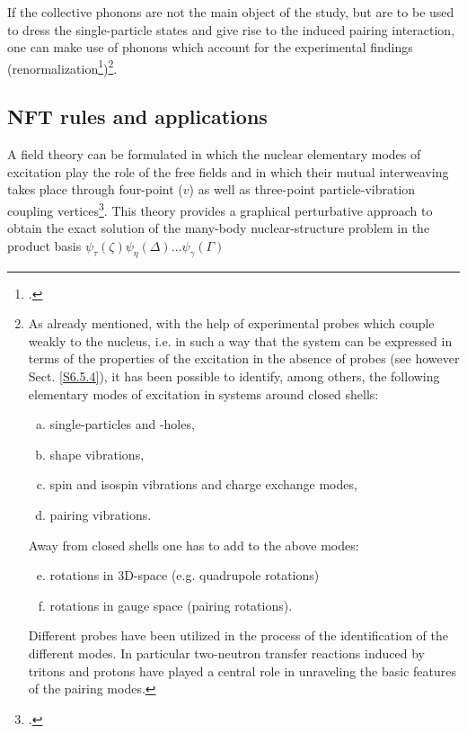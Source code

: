 If the collective phonons are not the main object  of the study, but are to be used to dress the single-particle states and give rise to the induced pairing interaction, one can make use of phonons which account for the experimental findings (renormalization\footnote{\cite{Idini:15,Broglia:16,Barranco:17}.})\footnote{As already mentioned, with the help of experimental probes which couple weakly to the nucleus,
i.e. in such a way that the system can be expressed in terms of the properties
of the excitation in the absence of probes (see however Sect. \ref{S6.5.4}), it has been possible to identify, among others, the
following elementary modes of excitation in systems around closed shells:
\begin{enumerate}[a)]
\item single-particles and -holes,
\item shape vibrations,
\item spin and isospin vibrations and charge exchange modes,
\item pairing vibrations.
\end{enumerate}
Away from closed shells one has to add to the above modes:
\begin{enumerate}[a)]
\setcounter{enumi}{4}
\item rotations in 3D-space (e.g. quadrupole rotations)
\item rotations in gauge space (pairing rotations).
\end{enumerate}
Different probes have been utilized in the process of the identification of the different modes. In particular two-neutron transfer reactions induced by tritons
and protons have played a central role in unraveling the basic features of the pairing modes.}.




 
\subsection{NFT rules and applications}\label{Sect1.7.2}
A field theory can be formulated in which the nuclear elementary modes of
excitation play the role of the free fields and in which their mutual interweaving takes place through four-point ($v$) as well as three-point particle-vibration coupling vertices\footnote{\cite{Bes:74,Broglia:76,Bohr:75,Mottelson:76}.}.
This theory provides a graphical perturbative approach to obtain the exact
solution of the many-body nuclear-structure problem in the product basis $\psi_\tau(\zeta)\psi_\eta(\Delta)\dots\psi_\gamma(\Gamma)$




